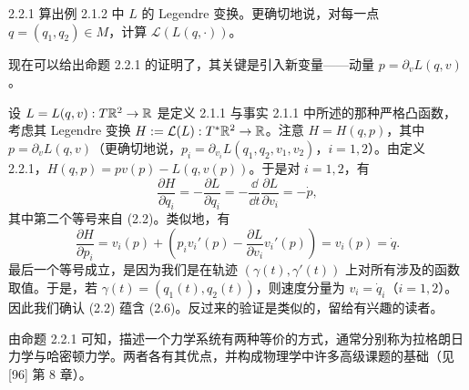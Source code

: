 \begin{wexer}{2.2.1}
算出例 2.1.2 中 $L$ 的 Legendre 变换。更确切地说，对每一点 $q=(q_1,q_2)\in M$，计算 $\mathcal{L}(L(q,\cdot))$。
\end{wexer}

现在可以给出命题 2.2.1 的证明了，其关键是引入新变量——动量 $p=\partial_vL(q,v)$。

\begin{wproof}[命题 2.2.1 的证明]
设 $L=L(q,v):T\mathbb{R}^2\to\mathbb{R}$ 是定义 2.1.1 与事实 2.1.1 中所述的那种严格凸函数，考虑其 Legendre 变换 $H:=\mathcal{L}(L):T^*\mathbb{R}^2\to\mathbb{R}$。注意 $H=H(q,p)$，其中 $p=\partial_vL(q,v)$（更确切地说，$p_i=\partial_{v_i}L(q_1,q_2,v_1,v_2)$，$i=1,2$）。由定义 2.2.1，$H(q,p)=pv(p)-L(q,v(p))$。于是对 $i=1,2$，有
\[
  \frac{\partial H}{\partial q_i}=-\frac{\partial L}{\partial q_i}
  =-\frac{\dd}{\dd t}\frac{\partial L}{\partial v_i}=-\dot p,
\]
其中第二个等号来自 (2.2)。类似地，有
\[
  \frac{\partial H}{\partial p_i}
  =v_i(p)+\left(p_iv_i'(p)-\frac{\partial L}{\partial v_i}v_i'(p)\right)=v_i(p)=\dot q .
\]
最后一个等号成立，是因为我们是在轨迹 $(\gamma(t),\gamma'(t))$ 上对所有涉及的函数取值。于是，若 $\gamma(t)=(q_1(t),q_2(t))$，则速度分量为 $v_i=\dot q_i$（$i=1,2$）。因此我们确认 (2.2) 蕴含 (2.6)。反过来的验证是类似的，留给有兴趣的读者。
\end{wproof}

由命题 2.2.1 可知，描述一个力学系统有两种等价的方式，通常分别称为拉格朗日力学与哈密顿力学。两者各有其优点，并构成物理学中许多高级课题的基础（见 [96] 第 8 章）。

